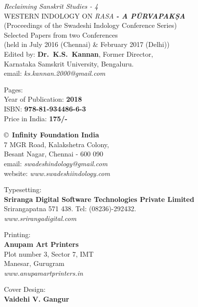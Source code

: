 \thispagestyle{empty}

\noindent
{\fontsize{9}{11}\selectfont\sl Reclaiming Sanskrit Studies - 4}\\
WESTERN INDOLOGY ON {\sl RASA} {\sl\bfseries - A PŪRVAPAKṢA}\\
(Proceedings of the Swadeshi Indology Conference Series)\\
Selected Papers from two Conferences\\ 
(held in July 2016 (Chennai) \& February 2017 (Delhi))\\
Edited by: {\bf Dr.\ K.S.\ Kannan}, Former Director,\\ 
Karnataka Samskrit University, Bengaluru.\\
email: {\sl ks.kannan.2000@gmail.com}
\vfill

\noindent
Pages: {\bf\pageref{bookend}}\\
Year of Publication: {\bf 2018}\\
ISBN: {\bf 978-81-934486-6-3}\\
Price in India: {\bf 175/-}
\vfill

\noindent
\copyright\ {\bf Infinity Foundation India}\\ 
7 MGR Road, Kalakshetra Colony,\\ 
Besant Nagar, Chennai - 600 090\\
email: {\sl swadeshindology@gmail.com}\\
website: {\sl www.swadeshiindology.com} 
\vfill

\noindent
Typesetting:\\ 
{\bf Sriranga Digital Software Technologies Private Limited}\\ 
Srirangapatna 571 438. Tel: (08236)-292432.\\
{\sl www.srirangadigital.com}
\vfill

\noindent
Printing:\\
{\bf Anupam Art Printers}\\
Plot number 3, Sector 7, IMT\\
Manesar, Gurugram\\
{\sl www.anupamartprinters.in}
\noindent

\bigskip

Cover Design:\\ 
{\bf Vaidehi V. Gangur}

